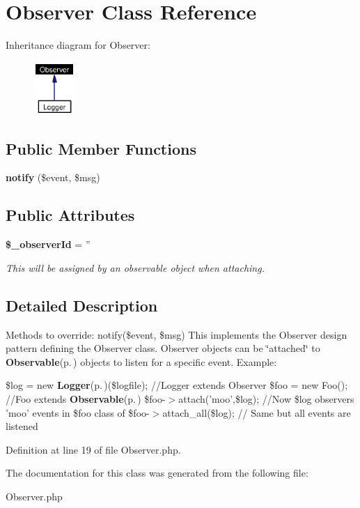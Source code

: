 \section{Observer Class Reference}
\label{classObserver}
Inheritance diagram for Observer:\begin{figure}[H]
\begin{center}
\leavevmode
\includegraphics[width=45pt]{classObserver__inherit__graph}
\end{center}
\end{figure}
\subsection*{Public Member Functions}
\begin{CompactItemize}
\item 
{\bf notify} (\$event, \$msg)\label{classObserver_a0}

\end{CompactItemize}
\subsection*{Public Attributes}
\begin{CompactItemize}
\item 
{\bf \$\_\-observer\-Id} = ''\label{classObserver_o0}

\begin{CompactList}\small\item\em This will be assigned by an observable object when attaching. \item\end{CompactList}\end{CompactItemize}


\subsection{Detailed Description}
Methods to override: notify(\$event, \$msg) This implements the Observer design pattern defining the Observer class. Observer objects can be \char`\"{}attached\char`\"{} to {\bf Observable}{\rm (p.\,\pageref{classObservable})} objects to listen for a specific event. Example:

\$log = new {\bf Logger}{\rm (p.\,\pageref{classLogger})}(\$logfile); //Logger extends Observer \$foo = new Foo(); //Foo extends {\bf Observable}{\rm (p.\,\pageref{classObservable})} \$foo-$>$attach('moo',\$log); //Now \$log observers 'moo' events in \$foo class of \$foo-$>$attach\_\-all(\$log); // Same but all events are listened 



Definition at line 19 of file Observer.php.

The documentation for this class was generated from the following file:\begin{CompactItemize}
\item 
Observer.php\end{CompactItemize}
